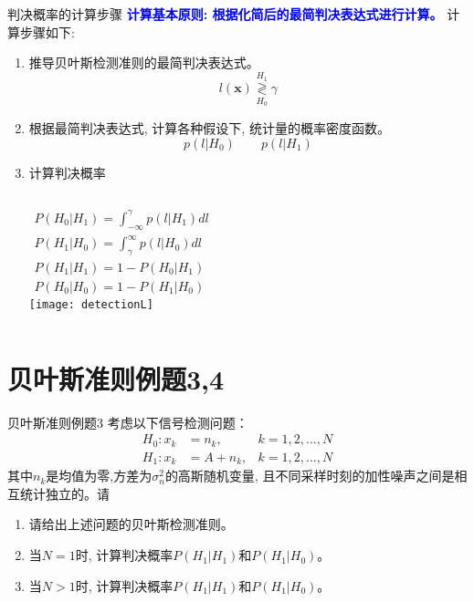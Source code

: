 \begin{frame}[shrink]{判决概率的计算步骤}
\textbf{\textcolor{blue}{计算基本原则: 根据化简后的最简判决表达式进行计算。}} 计算步骤如下:
\begin{enumerate}
	\item 推导贝叶斯检测准则的最简判决表达式。 \[l(\bm{x})\mathop{\gtrless}\limits_{H_0}^{H_1}\gamma \]
	\item 根据最简判决表达式, 计算各种假设下, 统计量的概率密度函数。
	\[p(l|H_0)\qquad p(l|H_1)\]
	\item 计算判决概率
	\begin{columns}
		\begin{align*}
		P(H_0|H_1)=\int_{-\infty}^{\gamma}p(l|H_1)dl\\
		P(H_1|H_0)=\int_{\gamma}^{\infty}p(l|H_0)dl\\
		P(H_1|H_1)=1-P(H_0|H_1)\\
		P(H_0|H_0)=1-P(H_1|H_0)
		\end{align*}
		\texttt{[image: detectionL]}
	\end{columns}
\end{enumerate}
\end{frame}

\section{贝叶斯准则例题3,4}

\begin{frame}{贝叶斯准则例题3}
考虑以下信号检测问题：
\begin{align*}
H_0: x_k&=n_{k},   & k=1,2,\dots,N\\
H_1: x_k&=A+n_{k}, & k=1,2,\dots,N
\end{align*}
其中$n_{k}$是均值为零,方差为$\sigma_n^2$的高斯随机变量,  且不同采样时刻的加性噪声之间是相互统计独立的。请\\
\begin{enumerate}
	\item 请给出上述问题的贝叶斯检测准则。
	\item 当$N=1$时, 计算判决概率$P(H_1|H_1)$和$P(H_1|H_0)$。
	\item 当$N>1$时, 计算判决概率$P(H_1|H_1)$和$P(H_1|H_0)$。
\end{enumerate}
\end{frame}


